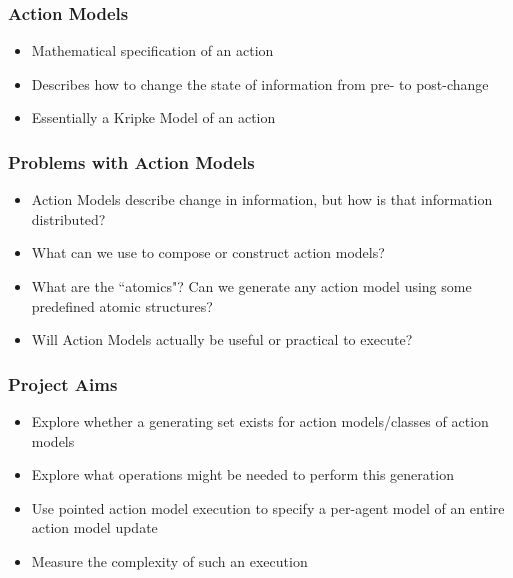 \documentclass{beamer}
\begin{document}
\begin{frame}
\frametitle{Action Models}
\begin{itemize}
  \item Mathematical specification of an action
  \item Describes how to change the state of information from pre- to post-change
  \item Essentially a Kripke Model of an action
\end{itemize}
\end{frame}

\begin{frame}
  \frametitle{Problems with Action Models}
\begin{itemize}
  \item Action Models describe change in information, but how is that information distributed?
  \item What can we use to compose or construct action models?
  \item What are the ``atomics"? Can we generate any action model using some predefined atomic structures?
  \item Will Action Models actually be useful or practical to execute?
\end{itemize}
\end{frame}

\begin{frame}
\frametitle{Project Aims}
\begin{itemize}
  \item Explore whether a generating set exists for action models/classes of action models
  \item Explore what operations might be needed to perform this generation
  \item Use pointed action model execution to specify a per-agent model of an entire action model update
  \item Measure the complexity of such an execution
\end{itemize}
\end{frame}
\end{document}
